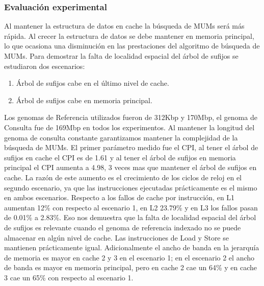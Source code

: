 \documentclass[12pt,a4paper]{article}
\begin{document}
\subsubsection{Evaluación experimental}
\indent
Al mantener la estructura de datos en cache la búsqueda de MUMs será más rápida. Al crecer la estructura de datos se debe mantener en memoria principal, lo que ocasiona una disminución en las prestaciones del algoritmo de búsqueda de MUMs.
Para demostrar la falta de localidad espacial del árbol de sufijos se estudiaron dos escenarios:
\begin{enumerate}
\item Árbol de sufijos cabe en el último nivel de cache.
\item Árbol de sufijos cabe en memoria principal.
\end{enumerate}
Los genomas de Referencia utilizados fueron de 312Kbp y 170Mbp, el genoma de Consulta fue de 169Mbp en todos los experimentos. Al mantener la longitud del genoma de consulta constante garantizamos mantener la complejidad de la búsqueda de MUMs.
El primer parámetro medido fue el CPI, al tener el árbol de sufijos en cache el CPI es de 1.61 y al tener el árbol de sufijos en memoria principal el CPI aumenta a 4.98, 3 veces mas que mantener el árbol de sufijos en cache. La razón de este aumento es el crecimiento de los ciclos de reloj en el segundo escenario, ya que las instrucciones ejecutadas prácticamente es el mismo en ambos escenarios.
Respecto a los fallos de cache por instrucción, en L1 aumentan 12\% con respecto al escenario 1, en L2 23.79\% y en L3 los fallos pasan de 0.01\% a 2.83\%. Eso nos demuestra que la falta de localidad espacial del árbol de sufijos es relevante cuando el genoma de referencia indexado no se puede almacenar en algún nivel de cache. Las instrucciones de Load y Store se mantienen prácticamente igual. Adicionalmente el ancho de banda en la jerarquía de memoria es mayor en cache 2 y 3 en el escenario 1; en el escenario 2 el ancho de banda es mayor en memoria principal, pero en cache 2 cae un 64\% y en cache 3 cae un 65\% con respecto al escenario 1.
\end{document}
